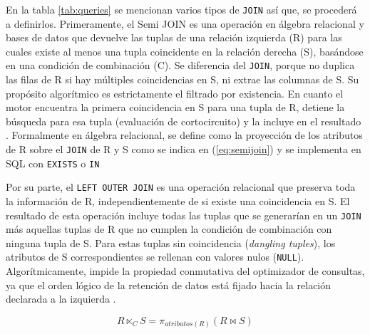 \documentclass[12pt, letter paper]{report}
\begin{document}
        En la tabla \ref{tab:queries} se mencionan varios tipos de \texttt{JOIN}
        así que, se procederá a definirlos. Primeramente, el Semi JOIN es una
        operación en álgebra relacional y bases de datos que devuelve las tuplas
        de una relación izquierda (R) para las cuales existe al menos una tupla
        coincidente en la relación derecha (S), basándose en una condición de
        combinación (C). Se diferencia del \texttt{JOIN}, porque no duplica las
        filas de R si hay múltiples coincidencias en S, ni extrae las columnas
        de S. Su propósito algorítmico es estrictamente el filtrado por
        existencia. En cuanto el motor encuentra la primera coincidencia en S
        para una tupla de R, detiene la búsqueda para esa tupla (evaluación de
        cortocircuito) y la incluye en el resultado
        \cite{silberschatz2019database}. Formalmente en álgebra relacional,
        se define como la proyección de los atributos de R sobre el
        \texttt{JOIN} de R y S como se indica en (\ref{eq:semijoin}) y se
        implementa en SQL con \texttt{EXISTS} o \texttt{IN}

        Por su parte, el \texttt{LEFT OUTER JOIN} es una operación relacional
        que preserva toda la información de R, independientemente de si existe
        una coincidencia en S. El resultado de esta operación incluye todas las
        tuplas que se generarían en un \texttt{JOIN} más aquellas tuplas de R
        que no cumplen la condición de combinación con ninguna tupla de S. Para
        estas tuplas sin coincidencia (\textit{dangling tuples}), los atributos
        de S correspondientes se rellenan con valores nulos (\texttt{NULL}).
        Algorítmicamente, impide la propiedad conmutativa del optimizador de
        consultas, ya que el orden lógico de la retención de datos está fijado
        hacia la relación declarada a la izquierda
        \cite{elmasri2016fundamentals}.

        \begin{equation}
          R \ltimes_{C} S = \pi_{atributos(R)}(R \bowtie S)
          \label{eq:semijoin}
        \end{equation}
\end{document}
